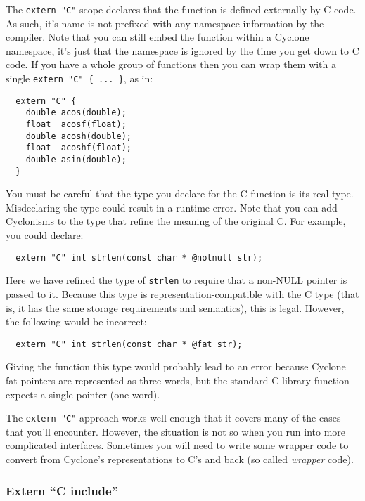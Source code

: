 The \texttt{extern "C"} scope declares that the function is
defined externally by C code.  As such, it's name is not
prefixed with any namespace information by the compiler.
Note that you can still embed the function within a Cyclone
namespace, it's just that the namespace is ignored by the
time you get down to C code.  
If you have a whole group of functions then you can wrap them with
a single \texttt{extern "C" \{ ... \}}, as in:
\begin{verbatim}
  extern "C" {
    double acos(double);
    float  acosf(float);
    double acosh(double);
    float  acoshf(float);
    double asin(double);
  }
\end{verbatim}
You must be careful that the type you declare for the C function is
its real type.  Misdeclaring the type could result in a runtime
error.  Note that you can add Cyclonisms to the type that refine the
meaning of the original C.  For example, you could declare:
\begin{verbatim}
  extern "C" int strlen(const char * @notnull str);
\end{verbatim}
Here we have refined the type of \texttt{strlen} to require that a
non-NULL pointer is passed to it.  Because this type is
representation-compatible with the C type (that is, it has the same
storage requirements and semantics), this is legal.  However, the
following would be incorrect:
\begin{verbatim}
  extern "C" int strlen(const char * @fat str);
\end{verbatim}
Giving the function this type would probably lead to an error because
Cyclone fat pointers are represented as three words, but the standard
C library function expects a single pointer (one word).

The \texttt{extern "C"} approach works well enough that it covers many
of the cases that you'll encounter.  However, the situation is not so
when you run into more complicated interfaces.  Sometimes you will
need to write some wrapper code to convert from Cyclone's
representations to C's and back (so called \emph{wrapper} code).

\subsubsection{Extern ``C include''}

